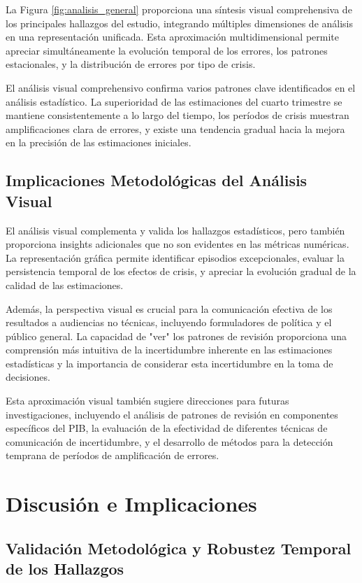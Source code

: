 \documentclass[12pt,a4paper]{article}
\begin{document}
La Figura \ref{fig:analisis_general} proporciona una síntesis visual comprehensiva de los principales hallazgos del estudio, integrando múltiples dimensiones de análisis en una representación unificada. Esta aproximación multidimensional permite apreciar simultáneamente la evolución temporal de los errores, los patrones estacionales, y la distribución de errores por tipo de crisis.

El análisis visual comprehensivo confirma varios patrones clave identificados en el análisis estadístico. La superioridad de las estimaciones del cuarto trimestre se mantiene consistentemente a lo largo del tiempo, los períodos de crisis muestran amplificaciones clara de errores, y existe una tendencia gradual hacia la mejora en la precisión de las estimaciones iniciales.

\subsection{Implicaciones Metodológicas del Análisis Visual}

El análisis visual complementa y valida los hallazgos estadísticos, pero también proporciona insights adicionales que no son evidentes en las métricas numéricas. La representación gráfica permite identificar episodios excepcionales, evaluar la persistencia temporal de los efectos de crisis, y apreciar la evolución gradual de la calidad de las estimaciones.

Además, la perspectiva visual es crucial para la comunicación efectiva de los resultados a audiencias no técnicas, incluyendo formuladores de política y el público general. La capacidad de "ver" los patrones de revisión proporciona una comprensión más intuitiva de la incertidumbre inherente en las estimaciones estadísticas y la importancia de considerar esta incertidumbre en la toma de decisiones.

Esta aproximación visual también sugiere direcciones para futuras investigaciones, incluyendo el análisis de patrones de revisión en componentes específicos del PIB, la evaluación de la efectividad de diferentes técnicas de comunicación de incertidumbre, y el desarrollo de métodos para la detección temprana de períodos de amplificación de errores.
\section{Discusión e Implicaciones}

\subsection{Validación Metodológica y Robustez Temporal de los Hallazgos}
\end{document}
